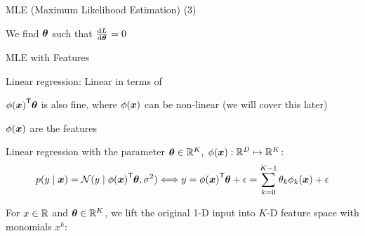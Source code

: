 \documentclass[handout,fleqn,aspectratio=169]{beamer}
\begin{document}
\begin{frame}{MLE (Maximum Likelihood Estimation) (3)}

\plitemsep 0.2in

\bci 

\item We find $\bm{\theta}$ such that $\frac{\text{d} L}{\text{d} \bm{\theta}}=0$ 

\eci
\end{frame}

\begin{frame}{MLE with Features}

\plitemsep 0.07in

\bci 

\item Linear regression: Linear in terms of 
\bci
\item ${\phi(\bm{x})}^{\mathsf{T}} \bm{\theta}$ is also fine, where $\phi(\bm{x})$ can be non-linear (we will cover this later)
\item $\phi(\bm{x})$ are the features
\eci

\item Linear regression with the parameter $\bm{\theta} \in {\mathbb R}^K,$ $\phi(\bm{x}): {\mathbb R}^{D} \mapsto {\mathbb R}^K$:
$$
p(y \mid \bm{x}) = \mathcal N(y \mid {\phi(\bm{x})}^{\mathsf{T}} \bm{\theta}, \sigma^2) \Longleftrightarrow y = {\phi(\bm{x})}^{\mathsf{T}} \bm{\theta} + \epsilon = \sum_{k=0}^{K-1} \theta_k \phi_k(\bm{x}) + \epsilon
$$

\item \exam {} For $x\in {\mathbb R}$ and $\bm{\theta} \in {\mathbb R}^K$, we lift the original 1-D input into $K$-D feature space with monomials $x^k$:

\eci
\end{frame}
\end{document}
